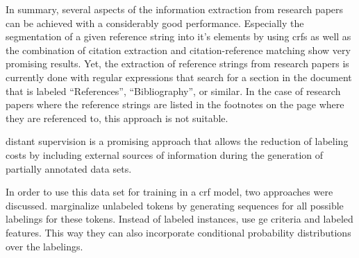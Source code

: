 In summary, several aspects of the information extraction from research papers can be achieved with a considerably good performance.
Especially the segmentation of a given reference string into it's elements by using \glspl{crf} \citep{peng2004accurate,councill2008parscit,groza2012reference} as well as the combination of citation extraction and citation-reference matching \citep{powley2007evidence} show very promising results.
Yet, the extraction of reference strings from research papers is currently done with regular expressions that search for a section in the document that is labeled ``References'', ``Bibliography'', or similar.
In the case of research papers where the reference strings are listed in the footnotes on the page where they are referenced to, this approach is not suitable.

\Gls{distant supervision} is a promising approach that allows the reduction of labeling costs by including external sources of information during the generation of partially annotated data sets.

In order to use this data set for training in a \gls{crf} model, two approaches were discussed.
\citet{tsuboi2008training} marginalize unlabeled tokens by generating sequences for all possible labelings for these tokens.
Instead of labeled instances, \citet{mann2008generalized} use \gls{ge} criteria and labeled features.
This way they can also incorporate \glspl{conditional probability distribution} over the labelings.



